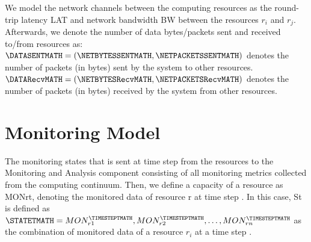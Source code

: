        We model the network channels between the computing resources as the round-trip latency LAT and network bandwidth BW between the resources $r_i$ and $r_j$.
        Afterwards, we denote the number of data bytes/packets sent and received to/from resources as: 
        $\DATASENTMATH = (\NETBYTESSENTMATH, \NETPACKETSSENTMATH)$ denotes the number of packets (in bytes) sent by the system to other resources.
        $\DATARecvMATH = (\NETBYTESRecvMATH, \NETPACKETSRecvMATH)$ denotes the number of packets (in bytes) received by the system from other resources.







    \section{Monitoring Model}
    \label{sec:monitoring-model}

        The monitoring states \STATET that is sent at time step \TIMESTEPT from the resources to the Monitoring and Analysis component consisting of all monitoring metrics collected from the computing continuum. 
        Then, we define a capacity of a resource as MONrt, denoting the monitored data of resource r at time step \TIMESTEPT. 
        In this case, St is defined as $\STATETMATH = {MON_{r1}^\TIMESTEPTMATH, MON_{r2}^\TIMESTEPTMATH, \dots, MON_{rn}^\TIMESTEPTMATH}$ as the combination of monitored data of a resource $r_i$ at a time step \TIMESTEPT.

